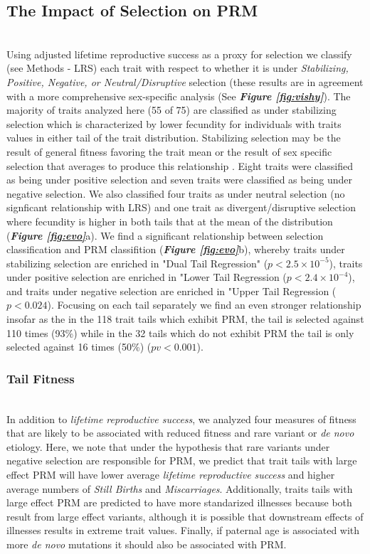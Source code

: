 \documentclass[times]{zHenriquesLab-StyleBioRxiv}
\newcommand\fref[1]{\normalsize{\textbf{\textit{Figure \ref{#1}}}}\normalsize{}}
\begin{document}
\subsection*{The Impact of Selection on PRM} ~\\
Using adjusted lifetime reproductive success \citep{v_select,
  v_select2} as a proxy for selection we classify (see Methods - LRS)
each trait with respect to whether it is under \emph{Stabilizing,
  Positive, Negative, or Neutral/Disruptive} selection (these results
are in agreement with a more comprehensive sex-specific analysis (See
\fref{fig:vishy}).  The majority of traits analyzed here (55 of 75)
are classified as under stabilizing selection which is characterized
by lower fecundity for individuals with traits values in either tail
of the trait distribution. Stabilizing selection may be the result of
general fitness favoring the trait mean or the result of sex specific
selection that averages to produce this relationship \citep{v_select}.
Eight traits were classified as being under positive selection and
seven traits were classified as being under negative selection.  We
also classified four traits as under neutral selection (no signficant
relationship with LRS) and one trait as divergent/disruptive selection
where fecundity is higher in both tails that at the mean of the
distribution (\fref{fig:evo}{a}).  We find a significant relationship
between selection classification and PRM classifition
(\fref{fig:evo}{b}), whereby traits under stabilizing selection are
enriched in "Dual Tail Regression" ($p< 2.5 \times 10^{-5}$), traits
under positive selection are enriched in "Lower Tail Regression
($p < 2.4 \times 10 ^{-4}$), and traits under negative selection are
enriched in "Upper Tail Regression ($p < 0.024$).  Focusing on each
tail separately we find an even stronger relationship insofar as the
in the 118 trait tails which exhibit PRM, the tail is selected against
110 times (93\%) while in the 32 tails which do not exhibit PRM the
tail is only selected against 16 times (50\%) ($pv < 0.001$).



\subsubsection*{Tail Fitness} ~\\ 
\noindent In addition to \emph{lifetime reproductive success}, we
analyzed four measures of fitness that are likely to be associated
with reduced fitness and rare variant or \emph{de novo} etiology.
Here, we note that under the hypothesis that rare variants under
negative selection are responsible for PRM, we predict that trait
tails with large effect PRM will have lower average \emph{lifetime
  reproductive success} and higher average numbers of \emph{Still
  Births} and \emph{Miscarriages}.  Additionally, traits tails with
large effect PRM are predicted to have more standarized illnesses
because both result from large effect variants, although it is
possible that downstream effects of illnesses results in extreme trait
values.  Finally, if paternal age is associated with more \emph{de
  novo} mutations \citep{pat} it should also be associated with PRM.
\end{document}
